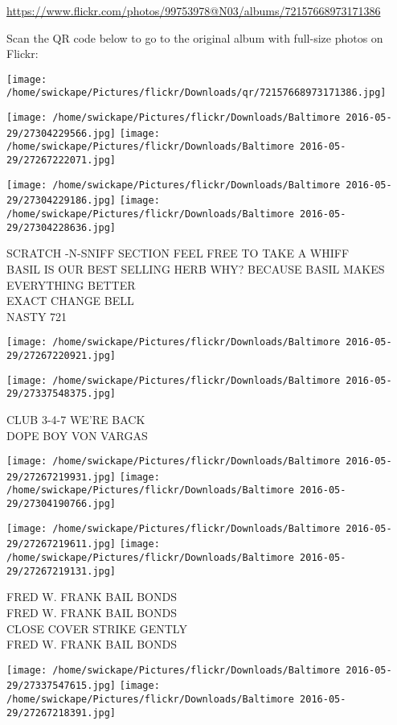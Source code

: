 \documentclass[10pt,letterpaper]{article}
\begin{document}
\url{https://www.flickr.com/photos/99753978@N03/albums/72157668973171386}

Scan the QR code below to go to the original album with full-size photos on Flickr:

\texttt{[image: /home/swickape/Pictures/flickr/Downloads/qr/72157668973171386.jpg]}
\pagebreak

\texttt{[image: /home/swickape/Pictures/flickr/Downloads/Baltimore 2016-05-29/27304229566.jpg]}
\texttt{[image: /home/swickape/Pictures/flickr/Downloads/Baltimore 2016-05-29/27267222071.jpg]}

\texttt{[image: /home/swickape/Pictures/flickr/Downloads/Baltimore 2016-05-29/27304229186.jpg]}
\texttt{[image: /home/swickape/Pictures/flickr/Downloads/Baltimore 2016-05-29/27304228636.jpg]}

SCRATCH {-}N{-}SNIFF SECTION FEEL FREE TO TAKE A WHIFF\\
BASIL IS OUR BEST SELLING HERB WHY?  BECAUSE BASIL MAKES EVERYTHING BETTER\\
EXACT CHANGE BELL\\
NASTY 721
\pagebreak

\texttt{[image: /home/swickape/Pictures/flickr/Downloads/Baltimore 2016-05-29/27267220921.jpg]}

\vspace{0.25in}
\texttt{[image: /home/swickape/Pictures/flickr/Downloads/Baltimore 2016-05-29/27337548375.jpg]}

CLUB 3{-}4{-}7 WE'RE BACK\\
DOPE BOY VON VARGAS
\pagebreak

\texttt{[image: /home/swickape/Pictures/flickr/Downloads/Baltimore 2016-05-29/27267219931.jpg]}
\texttt{[image: /home/swickape/Pictures/flickr/Downloads/Baltimore 2016-05-29/27304190766.jpg]}

\texttt{[image: /home/swickape/Pictures/flickr/Downloads/Baltimore 2016-05-29/27267219611.jpg]}
\texttt{[image: /home/swickape/Pictures/flickr/Downloads/Baltimore 2016-05-29/27267219131.jpg]}

FRED W. FRANK BAIL BONDS\\
FRED W. FRANK BAIL BONDS\\
CLOSE COVER STRIKE GENTLY\\
FRED W. FRANK BAIL BONDS
\pagebreak

\texttt{[image: /home/swickape/Pictures/flickr/Downloads/Baltimore 2016-05-29/27337547615.jpg]}
\texttt{[image: /home/swickape/Pictures/flickr/Downloads/Baltimore 2016-05-29/27267218391.jpg]}
\end{document}

